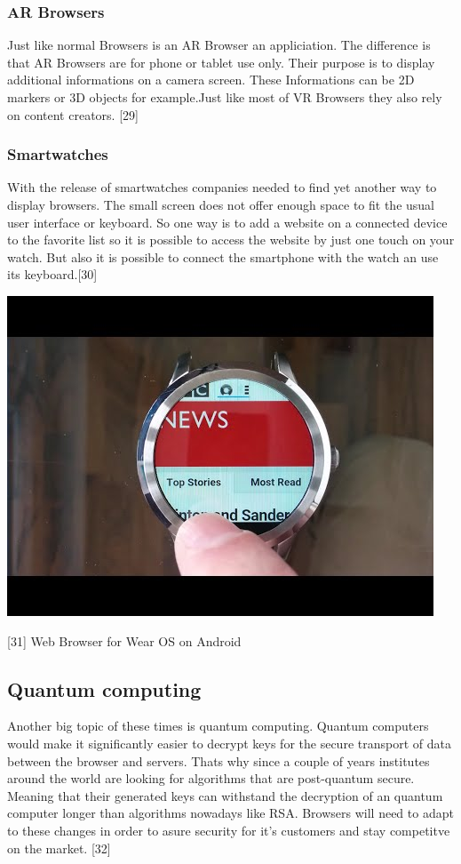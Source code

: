 \documentclass[runningheads]{llncs}
\begin{document}
			\subsubsection{AR Browsers}
				\leavevmode\newline
				Just like normal Browsers is an AR Browser an appliciation. The difference is that AR Browsers are for phone or tablet use only. Their purpose is to display additional informations on a camera screen. These Informations can be 2D markers or 3D objects for example.Just like most of VR Browsers they also rely on content creators. 
				[29]
			\subsubsection{Smartwatches}
			\leavevmode\newline
			With the release of smartwatches companies needed to find yet another way to display browsers. The small screen does not offer enough space to fit the usual user interface or keyboard. So one way is to add a website on a connected device to the favorite list so it is possible to access the website by just one touch on your watch. But also it is possible to connect the smartphone with the watch an use its keyboard.[30]
			\begin{center}
				\includegraphics[scale=0.35]{Smartwatch.jpg}
				
				[31] Web Browser for Wear OS on Android	
			\end{center}
		\subsection{Quantum computing}
		\leavevmode\newline
			Another big topic of these times is quantum computing. Quantum computers would make it significantly easier to decrypt keys for the secure transport of data between the browser and servers. Thats why since a couple of years institutes around the world are looking for algorithms that are post-quantum secure. Meaning that their generated keys can withstand the decryption of an quantum computer longer than algorithms nowadays like RSA. Browsers will need to adapt to these changes in order to asure security for it's customers and stay competitve on the market. 
			[32]
\end{document}
